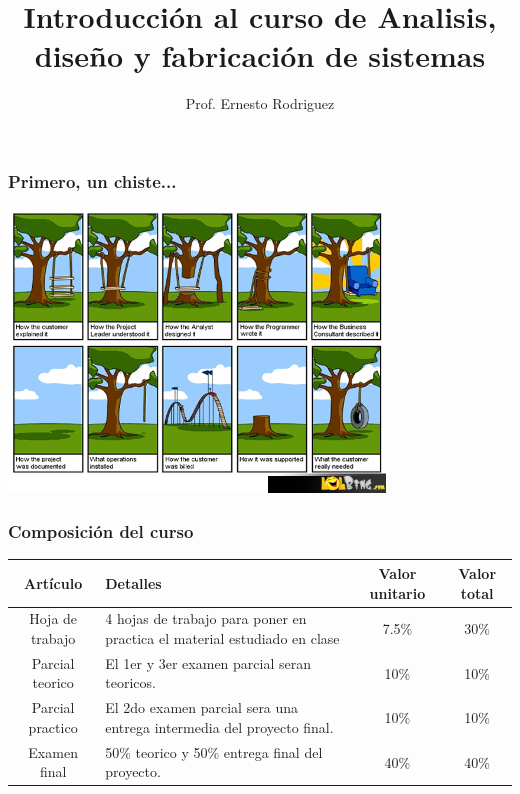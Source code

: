 \documentclass{beamer}
\title[Introducciòn]{Introducci\'on al curso de Analisis, dise\~{n}o y fabricaci\'on de sistemas}
\author{Prof. Ernesto Rodriguez}
\institute{
    Universidad del Itsmo \\
    \medskip \textit{erodriguez@unis.edu.gt}
}
\date[\today]{}
\begin{document}
\begin{frame}
\titlepage
\end{frame}

\begin{frame}
\frametitle{Primero, un chiste...}
\begin{center}
\includegraphics[width=10cm]{software-engineering-explained.png}
\end{center}
\end{frame}

\begin{frame}
    \frametitle{Composici\'on del curso}
    \begin{tabular}{|c|p{3.8cm}|c|c|}
        \hline
        \bf{Art\'iculo} & \bf{Detalles} & \bf{Valor unitario} & \bf{Valor total} \\
        \hline
        Hoja de trabajo & 4 hojas de trabajo para poner en practica el material estudiado en clase & 7.5\% & 30\% \\
        \hline
        Parcial teorico & El 1er y 3er examen parcial seran teoricos. & 10\% & 10\% \\
        \hline
        Parcial practico & El 2do examen parcial sera una entrega intermedia del proyecto final. & 10\% & 10\% \\
        \hline
        Examen final & 50\% teorico y 50\% entrega final del proyecto. & 40\% & 40\% \\
        \hline
        
    \end{tabular}
\end{frame}
\end{document}
